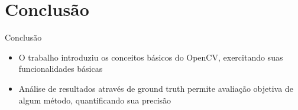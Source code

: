 \documentclass[
    style=paintings,
    paper=screen,
    blackslide,
    nopagebreaks,
    fleqn
]{powerdot}
\begin{document}
\section[slide=false]{Conclusão}
\begin{slide}{Conclusão}
\begin{itemize}[type=1]
\item <1-> O trabalho introduziu os conceitos básicos do OpenCV, exercitando suas funcionalidades básicas
\item <2-> Análise de resultados através de ground truth permite avaliação objetiva de algum método, quantificando sua precisão
\end{itemize}
\end{slide}

%
%
\end{document}
